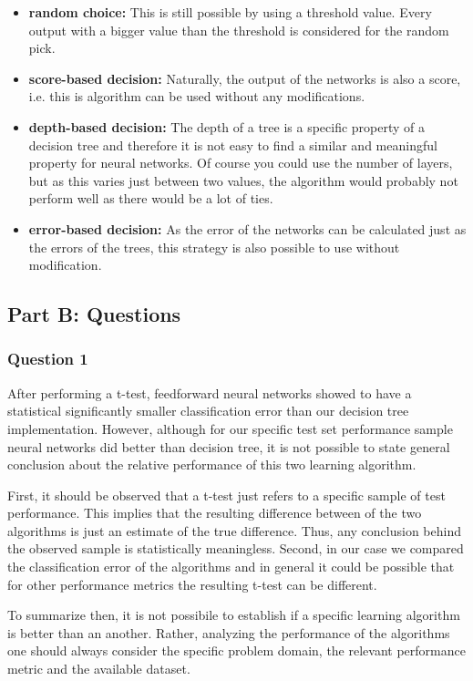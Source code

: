 \documentclass{article}
\begin{document}
\begin{itemize}
    \item \textbf{random choice:} This is still possible by using a threshold value. Every output with a bigger value than the threshold is considered for the random pick.
    \item \textbf{score-based decision:} Naturally, the output of the networks is also a score, i.e. this is algorithm can be used without any modifications.
    \item \textbf{depth-based decision:} The depth of a tree is a specific property of a decision tree and therefore it is not easy to find a similar and meaningful property for neural networks. Of course you could use the number of layers, but as this varies just between two values, the algorithm would probably not perform well as there would be a lot of ties.
    \item \textbf{error-based decision:} As the error of the networks can be calculated just as the errors of the trees, this strategy is also possible to use without modification.
\end{itemize}


\subsection{Part B: Questions}
\subsubsection*{Question 1}
After performing a t-test, feedforward neural networks showed to have a statistical significantly smaller classification error than our decision tree implementation. However, although for our specific test set performance sample neural networks did better than decision tree, it is not possible to state general conclusion about the relative performance of this two learning algorithm. 

First, it should be observed that a t-test just refers to a specific sample of test performance. This implies that the resulting difference between of the two algorithms is just an estimate of the true difference. Thus, any conclusion behind the observed sample is statistically meaningless. Second, in our case we compared the classification error of the algorithms and in general it could be possible that for other performance metrics the resulting t-test can be different. 

To summarize then, it is not possibile to establish if a specific learning algorithm is better than an another. Rather, analyzing the performance of the algorithms one should always consider the specific problem domain, the relevant performance metric and the available dataset.
\end{document}
